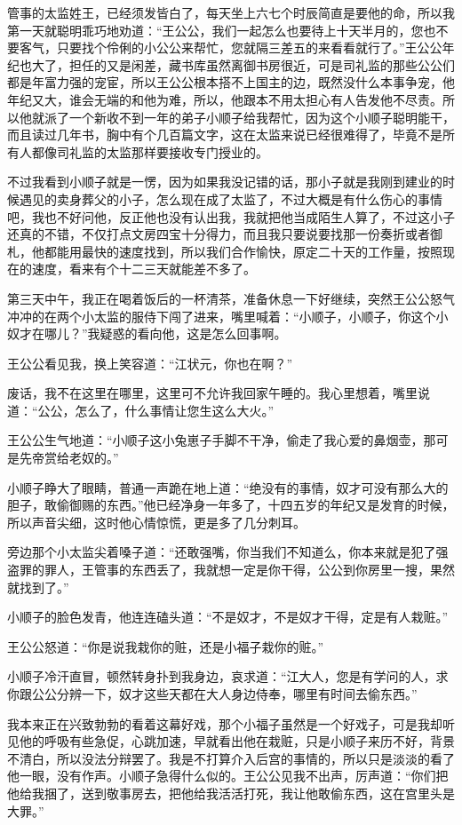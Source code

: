 管事的太监姓王，已经须发皆白了，每天坐上六七个时辰简直是要他的命，所以我第一天就聪明乖巧地劝道：“王公公，我们一起怎么也要待上十天半月的，您也不要客气，只要找个伶俐的小公公来帮忙，您就隔三差五的来看看就行了。”王公公年纪也大了，担任的又是闲差，藏书库虽然离御书房很近，可是司礼监的那些公公们都是年富力强的宠宦，所以王公公根本搭不上国主的边，既然没什么本事争宠，他年纪又大，谁会无端的和他为难，所以，他跟本不用太担心有人告发他不尽责。所以他就派了一个新收不到一年的弟子小顺子给我帮忙，因为这个小顺子聪明能干，而且读过几年书，胸中有个几百篇文字，这在太监来说已经很难得了，毕竟不是所有人都像司礼监的太监那样要接收专门授业的。

不过我看到小顺子就是一愣，因为如果我没记错的话，那小子就是我刚到建业的时候遇见的卖身葬父的小子，怎么现在成了太监了，不过大概是有什么伤心的事情吧，我也不好问他，反正他也没有认出我，我就把他当成陌生人算了，不过这小子还真的不错，不仅打点文房四宝十分得力，而且我只要说要找那一份奏折或者御札，他都能用最快的速度找到，所以我们合作愉快，原定二十天的工作量，按照现在的速度，看来有个十二三天就能差不多了。

第三天中午，我正在喝着饭后的一杯清茶，准备休息一下好继续，突然王公公怒气冲冲的在两个小太监的服侍下闯了进来，嘴里喊着：“小顺子，小顺子，你这个小奴才在哪儿？”我疑惑的看向他，这是怎么回事啊。

王公公看见我，换上笑容道：“江状元，你也在啊？”

废话，我不在这里在哪里，这里可不允许我回家午睡的。我心里想着，嘴里说道：“公公，怎么了，什么事情让您生这么大火。”

王公公生气地道：“小顺子这小兔崽子手脚不干净，偷走了我心爱的鼻烟壶，那可是先帝赏给老奴的。”

小顺子睁大了眼睛，普通一声跪在地上道：“绝没有的事情，奴才可没有那么大的胆子，敢偷御赐的东西。”他已经净身一年多了，十四五岁的年纪又是发育的时候，所以声音尖细，这时他心情惊慌，更是多了几分刺耳。

旁边那个小太监尖着嗓子道：“还敢强嘴，你当我们不知道么，你本来就是犯了强盗罪的罪人，王管事的东西丢了，我就想一定是你干得，公公到你房里一搜，果然就找到了。”

小顺子的脸色发青，他连连磕头道：“不是奴才，不是奴才干得，定是有人栽赃。”

王公公怒道：“你是说我栽你的赃，还是小福子栽你的赃。”

小顺子冷汗直冒，顿然转身扑到我身边，哀求道：“江大人，您是有学问的人，求你跟公公分辨一下，奴才这些天都在大人身边侍奉，哪里有时间去偷东西。”

我本来正在兴致勃勃的看着这幕好戏，那个小福子虽然是一个好戏子，可是我却听见他的呼吸有些急促，心跳加速，早就看出他在栽赃，只是小顺子来历不好，背景不清白，所以没法分辩罢了。我是不打算介入后宫的事情的，所以只是淡淡的看了他一眼，没有作声。小顺子急得什么似的。王公公见我不出声，厉声道：“你们把他给我捆了，送到敬事房去，把他给我活活打死，我让他敢偷东西，这在宫里头是大罪。”

